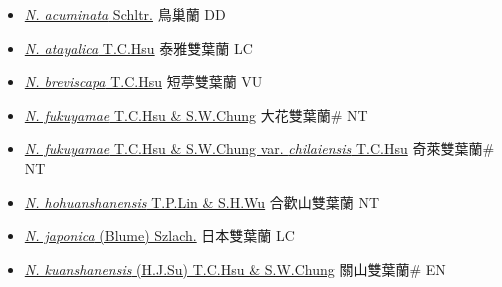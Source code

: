 \begin{itemize}
  \begin{itemize}
        \item[] \href{http://www.theplantlist.org/tpl1.1/search?q=Neottia+acuminata}{\textit{N. acuminata} Schltr.}   鳥巢蘭 DD
        \item[] \href{http://www.theplantlist.org/tpl1.1/search?q=Neottia+atayalica}{\textit{N. atayalica} T.C.Hsu}   泰雅雙葉蘭 LC
        \item[] \href{http://www.theplantlist.org/tpl1.1/search?q=Neottia+breviscapa}{\textit{N. breviscapa} T.C.Hsu}   短葶雙葉蘭 VU
        \item[] \href{http://www.theplantlist.org/tpl1.1/search?q=Neottia+fukuyamae}{\textit{N. fukuyamae} T.C.Hsu \& S.W.Chung}        大花雙葉蘭\# NT
        \item[] \href{http://www.theplantlist.org/tpl1.1/search?q=Neottia+fukuyamae+var.+chilaiensis}{\textit{N. fukuyamae} T.C.Hsu \& S.W.Chung var. \textit{chilaiensis} T.C.Hsu}   奇萊雙葉蘭\# NT
        \item[] \href{http://www.theplantlist.org/tpl1.1/search?q=Neottia+hohuanshanensis}{\textit{N. hohuanshanensis} T.P.Lin \& S.H.Wu}   合歡山雙葉蘭 NT
        \item[] \href{http://www.theplantlist.org/tpl1.1/search?q=Neottia+japonica}{\textit{N. japonica} (Blume) Szlach.}     日本雙葉蘭 LC
        \item[] \href{http://www.theplantlist.org/tpl1.1/search?q=Neottia+kuanshanensis}{\textit{N. kuanshanensis} (H.J.Su) T.C.Hsu \& S.W.Chung}     關山雙葉蘭\# EN

\end{itemize}
\end{itemize}
